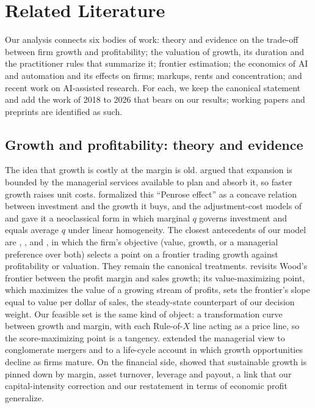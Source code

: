 \section{Related Literature}\label{sec:lit}

Our analysis connects six bodies of work: theory and evidence on the trade-off between firm growth and profitability; the valuation of growth, its duration and the practitioner rules that summarize it; frontier estimation; the economics of AI and automation and its effects on firms; markups, rents and concentration; and recent work on AI-assisted research. For each, we keep the canonical statement and add the work of 2018 to 2026 that bears on our results; working papers and preprints are identified as such.

\subsection{Growth and profitability: theory and evidence}

The idea that growth is costly at the margin is old. \citet{penrose1959theory} argued that expansion is bounded by the managerial services available to plan and absorb it, so faster growth raises unit costs. \citet{uzawa1969time} formalized this ``Penrose effect'' as a concave relation between investment and the growth it buys, and the adjustment-cost models of \citet{lucas1967adjustment} and \citet{hayashi1982tobin} gave it a neoclassical form in which marginal $q$ governs investment and equals average $q$ under linear homogeneity. The closest antecedents of our model are \citet{marris1963model,marris1964economic}, \citet{solow1971some}, \citet{wood1975theory} and \citet{odagiri1981theory}, in which the firm's objective (value, growth, or a managerial preference over both) selects a point on a frontier trading growth against profitability or valuation. They remain the canonical treatments. \citet{wood2025theory} revisits Wood's frontier between the profit margin and sales growth; its value-maximizing point, which maximizes the value of a growing stream of profits, sets the frontier's slope equal to value per dollar of sales, the steady-state counterpart of our decision weight. Our feasible set is the same kind of object: a transformation curve between growth and margin, with each Rule-of-$X$ line acting as a price line, so the score-maximizing point is a tangency. \citet{mueller1969theory,mueller1972life} extended the managerial view to conglomerate mergers and to a life-cycle account in which growth opportunities decline as firms mature. On the financial side, \citet{higgins1977how} showed that sustainable growth is pinned down by margin, asset turnover, leverage and payout, a link that our capital-intensity correction and our restatement in terms of economic profit generalize.

